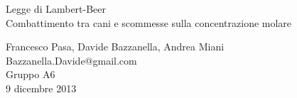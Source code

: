 \begin{center}

     	{\huge Legge di Lambert-Beer \\}
     	\vspace{0.2cm}
     	{\huge Combattimento tra cani e scommesse sulla concentrazione molare}
	\vspace{0.3cm}

      	{\large Francesco Pasa, Davide Bazzanella, Andrea Miani} \\
      	{Bazzanella.Davide@gmail.com} \\
		{\large Gruppo A6} \\
	
	\vspace{0.1cm}
      	{\large 9 dicembre 2013}

\end{center}
